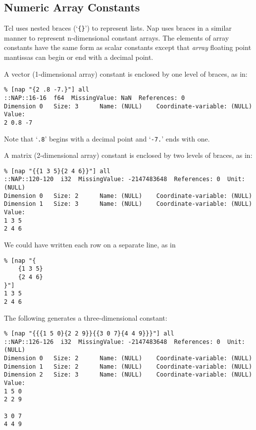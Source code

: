 \subsection{Numeric Array Constants}
      \label{const-Numeric-Array-Constants}

Tcl uses nested braces (`\texttt{\{\}}') to represent lists.
    Nap uses braces in a
    similar manner to represent n-dimensional constant arrays. The
    elements of array constants have the same form as scalar
    constants except that \emph{array} floating point mantissas can begin or end
    with a decimal point.
    

A vector (1-dimensional array) constant is enclosed by one level
    of braces, as in:
\begin{verbatim}
% [nap "{2 .8 -7.}"] all
::NAP::16-16  f64  MissingValue: NaN  References: 0
Dimension 0   Size: 3      Name: (NULL)    Coordinate-variable: (NULL)
Value:
2 0.8 -7
\end{verbatim}

Note that `\texttt{.8}' begins with a decimal point
and `\texttt{-7.}' ends with one.
    

A matrix (2-dimensional array) constant is enclosed by two
    levels of braces, as in:
    \begin{verbatim}
% [nap "{{1 3 5}{2 4 6}}"] all
::NAP::120-120  i32  MissingValue: -2147483648  References: 0  Unit: (NULL)
Dimension 0   Size: 2      Name: (NULL)    Coordinate-variable: (NULL)
Dimension 1   Size: 3      Name: (NULL)    Coordinate-variable: (NULL)
Value:
1 3 5
2 4 6
\end{verbatim}

    

We could have written each row on a separate line, as in
    \begin{verbatim}
% [nap "{
    {1 3 5}
    {2 4 6}
}"]
1 3 5
2 4 6
\end{verbatim}

    

The following generates a three-dimensional constant:
    \begin{verbatim}
% [nap "{{{1 5 0}{2 2 9}}{{3 0 7}{4 4 9}}}"] all
::NAP::126-126  i32  MissingValue: -2147483648  References: 0  Unit: (NULL)
Dimension 0   Size: 2      Name: (NULL)    Coordinate-variable: (NULL)
Dimension 1   Size: 2      Name: (NULL)    Coordinate-variable: (NULL)
Dimension 2   Size: 3      Name: (NULL)    Coordinate-variable: (NULL)
Value:
1 5 0
2 2 9

3 0 7
4 4 9
\end{verbatim}

